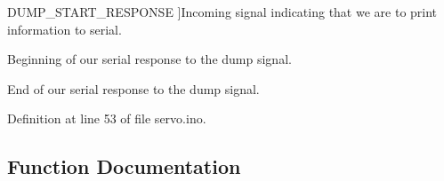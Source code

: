 \begin{Desc}
\begin{description}
{\hypertarget{servo_8ino_a99fb83031ce9923c84392b4e92f956b5a51975080564db9aa29bff29cce328b5f}{}D\+U\+M\+P\+\_\+\+S\+T\+A\+R\+T\+\_\+\+R\+E\+S\+P\+O\+N\+S\+E\label{servo_8ino_a99fb83031ce9923c84392b4e92f956b5a51975080564db9aa29bff29cce328b5f}
}]Incoming signal indicating that we are to print information to serial. \item[{\em 
\hypertarget{servo_8ino_a99fb83031ce9923c84392b4e92f956b5aa7ca295335eb71b345d3b0bd0e53277e}{}D\+U\+M\+P\+\_\+\+E\+N\+D\+\_\+\+R\+E\+S\+P\+O\+N\+S\+E\label{servo_8ino_a99fb83031ce9923c84392b4e92f956b5aa7ca295335eb71b345d3b0bd0e53277e}
}]Beginning of our serial response to the dump signal. \item[{\em 
\hypertarget{servo_8ino_a99fb83031ce9923c84392b4e92f956b5aebe1616f434c26e10f088aebf559d708}{}D\+U\+M\+P\+\_\+\+R\+E\+S\+P\+O\+N\+S\+E\+\_\+\+L\+E\+N\label{servo_8ino_a99fb83031ce9923c84392b4e92f956b5aebe1616f434c26e10f088aebf559d708}
}]End of our serial response to the dump signal. \end{description}
\end{Desc}


Definition at line 53 of file servo.\+ino.



\subsection{Function Documentation}
\hypertarget{servo_8ino_accd2600060dbaee3a3b41aed4034c63c}{}
